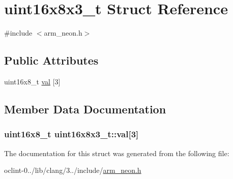 \hypertarget{structuint16x8x3__t}{\section{uint16x8x3\-\_\-t Struct Reference}
\label{structuint16x8x3__t}
}


{\ttfamily \#include $<$arm\-\_\-neon.\-h$>$}

\subsection*{Public Attributes}
\begin{DoxyCompactItemize}
\item 
uint16x8\-\_\-t \hyperlink{structuint16x8x3__t_abe1e664c587d316efb810cefa4290b4b}{val} \mbox{[}3\mbox{]}
\end{DoxyCompactItemize}


\subsection{Member Data Documentation}
\hypertarget{structuint16x8x3__t_abe1e664c587d316efb810cefa4290b4b}{
\subsubsection[{val}]{\setlength{\rightskip}{0pt plus 5cm}uint16x8\-\_\-t uint16x8x3\-\_\-t\-::val\mbox{[}3\mbox{]}}}\label{structuint16x8x3__t_abe1e664c587d316efb810cefa4290b4b}


The documentation for this struct was generated from the following file\-:\begin{DoxyCompactItemize}
\item 
oclint-\/0../lib/clang/3../include/\hyperlink{arm__neon_8h}{arm\-\_\-neon.\-h}\end{DoxyCompactItemize}
